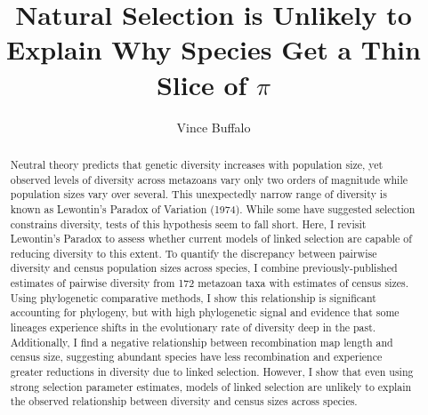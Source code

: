 \documentclass[11pt]{article}
\title{Natural Selection is Unlikely to Explain Why Species Get a Thin Slice of $\pi$}
\author{Vince Buffalo}
\affil[]{\footnotesize University of Oregon, Institute of Ecology and Evolution\\Eugene, Oregon \\ \href{mailto:vsbuffalo@gmail.com}{vsbuffalo@gmail.com}}
\begin{document}
\maketitle




\begin{abstract} 

 Neutral theory predicts that genetic diversity increases with population size,
 yet observed levels of diversity across metazoans vary only two orders of
 magnitude while population sizes vary over several. This unexpectedly narrow
 range of diversity is known as Lewontin's Paradox of Variation (1974). While
 some have suggested selection constrains diversity, tests of this hypothesis
 seem to fall short. Here, I revisit Lewontin's Paradox to assess whether
 current models of linked selection are capable of reducing diversity to this
 extent. To quantify the discrepancy between pairwise diversity and census
 population sizes across species, I combine previously-published estimates of
 pairwise diversity from 172 metazoan taxa with estimates of census sizes.
 Using phylogenetic comparative methods, I show this relationship is
 significant accounting for phylogeny, but with high phylogenetic signal and
 evidence that some lineages experience shifts in the evolutionary rate of
 diversity deep in the past. Additionally, I find a negative relationship
 between recombination map length and census size, suggesting abundant species
 have less recombination and experience greater reductions in diversity due to
 linked selection. However, I show that even using strong selection parameter
 estimates, models of linked selection are unlikely to explain the observed
 relationship between diversity and census sizes across species.

\end{abstract}
\end{document}

